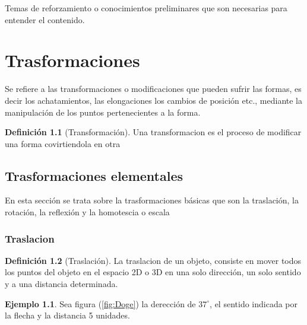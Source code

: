 \documentclass[
  16pt,
]{krantz}
\theoremstyle{definition}
\newtheorem{definition}{Definición}[chapter]
\theoremstyle{definition}
\newtheorem{example}{Ejemplo}[chapter]
\theoremstyle{definition}
\theoremstyle{definition}
\theoremstyle{remark}
\begin{document}
\hypertarget{appendix-apendice}{%
\appendix {}}


Temas de reforzamiento o conocimientos preliminares que son necesarias para entender el contenido.

\hypertarget{trasformaciones}{%
\chapter{Trasformaciones}\label{trasformaciones}}

Se refiere a las transformaciones o modificaciones que pueden sufrir las formas, es decir los achatamientos, las elongaciones los cambios de posición etc., mediante la manipulación de los puntos pertenecientes a la forma.

\begin{definition}[Transformación]
\protect\hypertarget{def:transformacion}{}{\label{def:transformacion} {} }Una transformacion es el proceso de modificar una forma covirtiendola en otra
\end{definition}

\hypertarget{trasformaciones-elementales}{%
\section{Trasformaciones elementales}\label{trasformaciones-elementales}}

En esta sección se trata sobre la trasformaciones básicas que son la traslación, la rotación, la reflexión y la homotescia o escala

\hypertarget{traslacion}{%
\subsection{Traslacion}\label{traslacion}}

\begin{definition}[Traslación]
\protect\hypertarget{def:traslacion}{}{\label{def:traslacion} {} }La traslacion de un objeto, consiste en mover todos los puntos del objeto en el espacio 2D o 3D en una solo dirección, un solo sentido y a una distancia determinada.
\end{definition}

\begin{example}
\protect\hypertarget{exm:unnamed-chunk-3}{}{\label{exm:unnamed-chunk-3} }Sea figura (\ref{fig:Doge}) la derección de \(37^\circ\), el sentido indicada por la flecha y la distancia 5 unidades.
\end{example}
\end{document}
